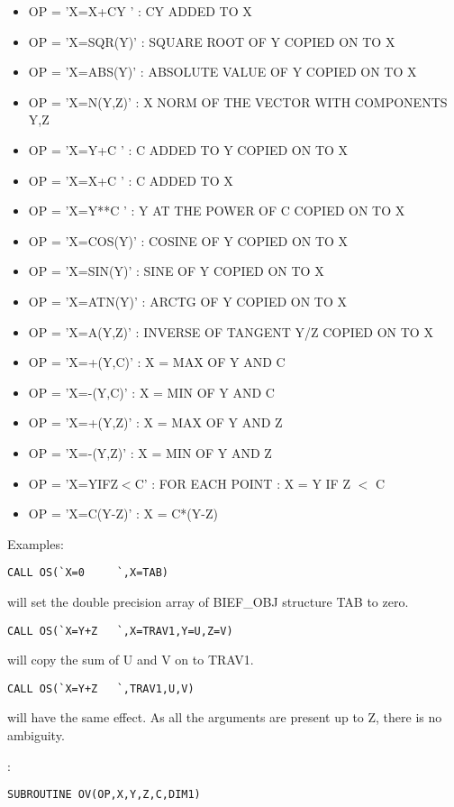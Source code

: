 \begin{itemize}
  \item OP = 'X=X+CY  ' :  CY ADDED TO X
  \item OP = 'X=SQR(Y)' :  SQUARE ROOT OF Y COPIED ON TO X
  \item OP = 'X=ABS(Y)' :  ABSOLUTE VALUE OF Y COPIED ON TO X
  \item OP = 'X=N(Y,Z)' :  X NORM OF THE VECTOR WITH COMPONENTS Y,Z
  \item OP = 'X=Y+C   ' :  C ADDED TO Y COPIED ON TO X
  \item OP = 'X=X+C   ' :  C ADDED TO X
  \item OP = 'X=Y**C  ' :  Y AT THE POWER OF C COPIED ON TO X
  \item OP = 'X=COS(Y)' :  COSINE OF Y COPIED ON TO X
  \item OP = 'X=SIN(Y)' :  SINE OF Y COPIED ON TO X
  \item OP = 'X=ATN(Y)' :  ARCTG OF Y COPIED ON TO X
  \item OP = 'X=A(Y,Z)' :  INVERSE OF TANGENT Y/Z COPIED ON TO X
  \item OP = 'X=+(Y,C)' :  X = MAX OF Y AND C
  \item OP = 'X=-(Y,C)' :  X = MIN OF Y AND C
  \item OP = 'X=+(Y,Z)' :  X = MAX OF Y AND Z
  \item OP = 'X=-(Y,Z)' :  X = MIN OF Y AND Z
  \item OP = 'X=YIFZ$<$C' :  FOR EACH POINT : X = Y IF Z $<$ C
  \item OP = 'X=C(Y-Z)' :  X = C*(Y-Z)
\end{itemize}

Examples:

\begin{lstlisting}[language=TelFortran]
CALL OS(`X=0     `,X=TAB)
\end{lstlisting}
will set the double precision array of BIEF\_OBJ structure TAB to zero.

\begin{lstlisting}[language=TelFortran]
CALL OS(`X=Y+Z   `,X=TRAV1,Y=U,Z=V)
\end{lstlisting}
will copy the sum of U and V on to TRAV1.

\begin{lstlisting}[language=TelFortran]
CALL OS(`X=Y+Z   `,TRAV1,U,V)
\end{lstlisting}
will have the same effect. As all the arguments are present up to Z, there is
no ambiguity.

:
\begin{lstlisting}[language=TelFortran]
SUBROUTINE OV(OP,X,Y,Z,C,DIM1)
\end{lstlisting}


